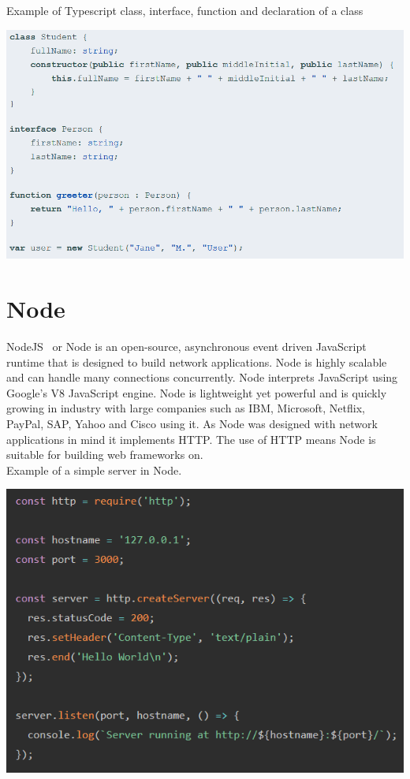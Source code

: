 Example of Typescript class, interface, function and declaration of a class
\begin{center}    
    \includegraphics[width=110
    mm]{img/Typescript.png}
\end{center}

\section{Node}
NodeJS~\cite{Node} or Node is an open-source, asynchronous event driven JavaScript runtime that is designed to build network applications. Node is highly scalable and can handle many connections concurrently. Node interprets JavaScript using Google's V8 JavaScript engine. Node is lightweight yet powerful and is quickly growing in industry with large companies such as IBM, Microsoft, Netflix, PayPal, SAP, Yahoo and Cisco using it. As Node was designed with network applications in mind it implements HTTP. The use of HTTP means Node is suitable for building web frameworks on. \\ 

Example of a simple server in Node.
\begin{center}    
    \includegraphics[width=140mm]{img/node.png}
\end{center}

